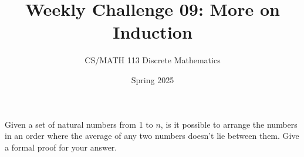\documentclass[a4paper]{exam}
\title{Weekly Challenge 09: More on Induction}
\author{CS/MATH 113 Discrete Mathematics}
\date{Spring 2025}
\begin{document}
\maketitle



\begin{questions}
    Given a set of natural numbers from 1 to $n$, is it possible to arrange the numbers in an order where the average of any two numbers doesn't lie between them. Give a formal proof for your answer.
    \begin{solution}
    \end{solution}
    
\end{questions}
\end{document}
